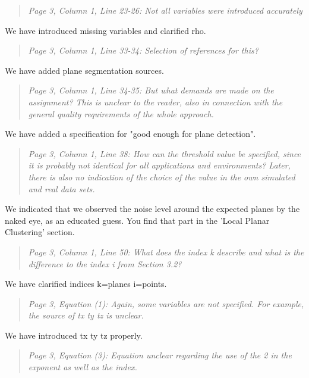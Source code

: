 \documentclass{article}
\newenvironment{itquote}
  {\begin{quote}\itshape}
  {\end{quote}\ignorespacesafterend}
\begin{document}
\begin{itquote}
Page 3, Column 1, Line 23-26: Not all variables were introduced
accurately
\end{itquote}

We have introduced missing variables and clarified rho.

\begin{itquote}
Page 3, Column 1, Line 33-34: Selection of references for this?
\end{itquote}

We have added plane segmentation sources.

\begin{itquote}
Page 3, Column 1, Line 34-35: But what demands are made on the
assignment? This is unclear to the reader, also in connection with
the general quality requirements of the whole approach.
\end{itquote}

We have added a specification for "good enough for plane detection".

\begin{itquote}
Page 3, Column 1, Line 38: How can the threshold value be specified,
since it is probably not identical for all applications and
environments? Later, there is also no indication of the choice of
the value in the own simulated and real data sets.
\end{itquote}

We indicated that we observed the noise level around the expected planes by the naked eye, as an educated guess. You find that part in the 'Local Planar Clustering' section.

\begin{itquote}
Page 3, Column 1, Line 50: What does the index k describe and what
is the difference to the index i from Section 3.2?
\end{itquote}

We have clarified indices k=planes i=points.

\begin{itquote}
Page 3, Equation (1): Again, some variables are not specified. For
example, the source of tx ty tz is unclear.
\end{itquote}

We have introduced tx ty tz properly.

\begin{itquote}
Page 3, Equation (3): Equation unclear regarding the use of the 2 in
the exponent as well as the index.
\end{itquote}
\end{document}
